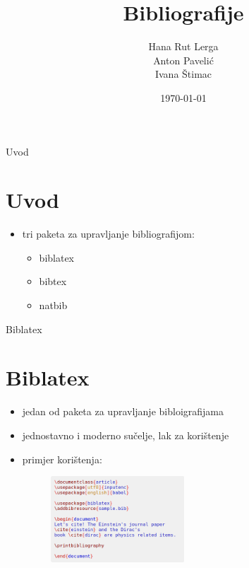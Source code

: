\documentclass{beamer}
\begin{document}
\title{Bibliografije}
\date{\today}
\author{Hana Rut Lerga \\ Anton Pavelić \\ Ivana Štimac}

\begin{frame}
\maketitle
\end{frame}

\begin{frame}
\tableofcontents
\end{frame}


\begin{frame}{Uvod}
\section{Uvod}
\begin{itemize}
	\item tri paketa za upravljanje bibliografijom:\\
	\begin{itemize}
		\item biblatex \\
		\item bibtex \\
		\item natbib \\
	\end{itemize}
\end{itemize}
	
\end{frame}

\begin{frame}{Biblatex}
\section{Biblatex}
\begin{itemize}
	\item jedan od paketa za upravljanje bibloigrafijama \\
	\item jednostavno i moderno sučelje, lak za korištenje \\
	\item primjer korištenja: \\
	\begin{figure}
	\includegraphics[width=5cm]{prviprimjer.png}
	\end{figure}
\end{itemize}
\end{frame}
\end{document}
